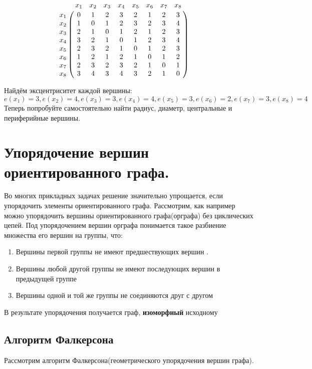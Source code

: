 \documentclass[12pt, a4paper, oneside]{article}
\theoremstyle{plain} %
\theoremstyle{definition}
\begin{document}
\[
 \bordermatrix{ & x_1 & x_2 & x_3 & x_4 & x_5 & x_6 &x_7 & x_8 \cr
  x_1 & 0 & 1 & 2 & 3 & 2 & 1 & 2 & 3 \cr
  x_2 & 1 & 0 & 1 & 2 & 3 & 2 & 3 & 4 \cr
  x_3 & 2 & 1 & 0 & 1 & 2 & 1 & 2 & 3  \cr
  x_4 & 3 & 2 & 1 & 0 & 1 & 2 & 3 & 4 \cr
  x_5 & 2 & 3 & 2 & 1 & 0 & 1 & 2 & 3 \cr
  x_6 & 1 & 2 & 1 & 2 & 1 & 0 & 1 & 2 \cr
  x_7 & 2 & 3 & 2 & 3 & 2 & 1 & 0 & 1 \cr
  x_8 & 3 & 4 & 3 & 4 & 3 & 2 & 1 & 0 } \qquad
\] 

Найдём эксцентриситет каждой вершины:
\[
e(x_1) = 3, 
e(x_2) = 4,
e(x_3) = 3,
e(x_4) = 4,
e(x_5) = 3, 
e(x_6) = 2,
e(x_7) = 3, 
e(x_8) = 4
\]
Теперь попробуйте самостоятельно найти радиус, диаметр, центральные и периферийные вершины. 

\raisebox{\depth}{\scalebox{1}[-1]{Ответ: r(G) = 2, d(G) = 4, центральная вершина: $x_6$, периферийные вершины: $x_2,x_4,x_6$}}

\section{Упорядочение вершин ориентированного графа.}

Во многих прикладных задачах решение значительно упрощается, если упорядочить элементы ориентированного графа. Рассмотрим, как например можно упорядочить вершины ориентированного графа(орграфа) без циклических цепей. Под упорядочением вершин орграфа понимается такое разбиение множества его вершин на группы, что:

\begin{enumerate}

\item  Вершины первой группы не имеют предшествующих вершин .

\item Вершины любой другой группы не имеют последующих вершин в предыдущей группе

\item Вершины одной и той же группы не соединяются друг с другом  

\end{enumerate}

В результате упорядочения получается граф, \textbf{изоморфный} исходному 

\subsection*{Алгоритм Фалкерсона}

Рассмотрим алгоритм Фалкерсона(геометрического упорядочения вершин графа).
\end{document}
